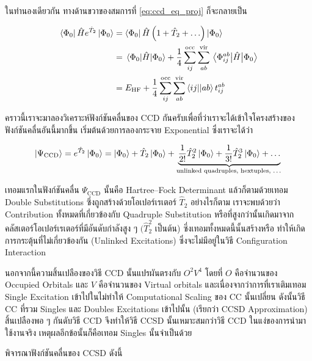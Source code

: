 ในทำนองเดียวกัน ทางด้านขวาของสมการที่ \eqref{eq:ccd_eq_proj} ก็จะกลายเป็น

\begin{equation}
  \begin{split}
    \bra{\Phi_0}\hat{H}e^{\hat{T}_2}\ket{\Phi_0}
    &=
    \bra{\Phi_0}\hat{H}\left(1 + \hat{T}_2 + \ldots\right)\ket{\Phi_0} \\
    &=  \expval{\hat{H}}{\Phi_0}
    + \frac{1}{4} \sum_{ij}^{\mathrm{occ}} \sum_{ab}^{\mathrm{vir}} \mel{\Phi_{ij}^{ab}}{\hat{H}}{\Phi_0} \\
    &= E_{\mathrm{HF}}
    + \frac{1}{4} \sum_{ij}^{\mathrm{occ}} \sum_{ab}^{\mathrm{vir}} \bra{ij}\!\ket{ab} t_{ij}^{ab}
  \end{split}
\end{equation}

คราวนี้เราจะมาลองวิเคราะห์ฟังก์ชันคลื่นของ CCD กันครับเพื่อที่ว่าเราจะได้เข้าใจโครงสร้างของฟังก์ชันคลื่นอันนี้มากขึ้น เริ่มต้นด้วยการลองกระจาย
Exponential ซึ่งเราจะได้ว่า

\begin{equation}
  \ket{\Psi_{\mathrm{CCD}}}
  = e^{\hat{T}_2} \ket{\Phi_0}
  = \ket{\Phi_0} + \hat{T}_2 \ket{\Phi_0}
  + \underbrace{\frac{1}{2!}\hat{T}_2^2\ket{\Phi_0}
    + \frac{1}{3!}\hat{T}_2^3\ket{\Phi_0}
    + \ldots}_{\text{unlinked quadruples, hextuples, \ldots}}
\end{equation}

\noindent เทอมแรกในฟังก์ชันคลื่น $\Psi_{\mathrm{CCD}}$ นั้นคือ Hartree--Fock Determinant แล้วก็ตามด้วยเทอม Double
Substitutions ซึ่งถูกสร้างด้วยโอเปอร์เรเตอร์ $\hat{T}_2$ อย่างไรก็ตาม เราจะพบด้วยว่า Contribution ทั้งหมดที่เกี่ยวข้องกับ Quadruple
Substitution หรือที่สูงกว่านั้นเกิดมาจากคลัสเตอร์โอเปอร์เรเตอร์ที่มีอันดับกำลังสูง ๆ $(\hat{T}_2^2$ เป็นต้น) ซึ่งเทอมทั้งหมดนี้นั้นสร้างหรือ%
ทำให้เกิดการกระตุ้นที่ไม่เกี่ยวข้องกัน (Unlinked Excitations) ซึ่งจะไม่มีอยู่ในวิธี Configuration Interaction

นอกจากนี้ความสิ้นเปลืองของวิธี CCD นั้นแปรผันตรงกับ $O^2V^4$ โดยที่ $O$ คือจำนวนของ Occupied Orbitals และ $V$ คือจำนวนของ
Virtual orbitals และเนื่องจากว่าการที่เราเติมเทอม Single Excitation เข้าไปในไม่ทำให้ Computational Scaling ของ CC นั้นเปลี่ยน
ดังนั้นวิธี CC ที่รวม Singles และ Doubles Excitations เข้าไปนั้น (เรียกว่า CCSD Approximation) สิ้นเปลืองพอ ๆ กันดับวิธี CCD
จึงทำให้วิธี CCSD นั้นเหมาะสมกว่าวิธี CCD ในแง่ของการนำมาใช้งานจริง เหตุผลอีกข้อนั้นก็คือเทอม Singles นั้นจำเป็นด้วย

พิจารณาฟังก์ชันคลื่นของ CCSD ดังนี้

